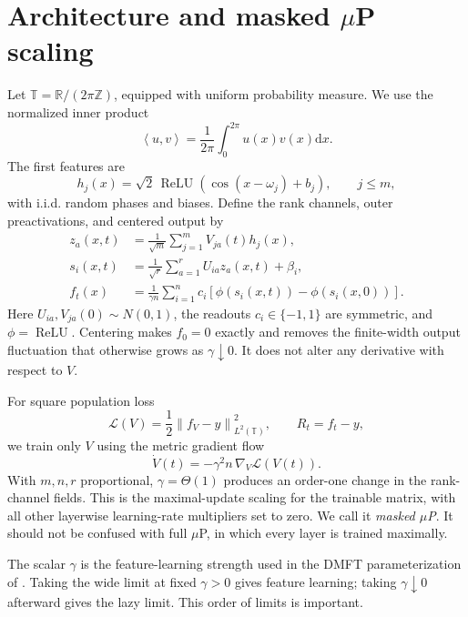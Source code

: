 \documentclass[11pt]{article}
\newcommand{\R}{\mathbb R}
\newcommand{\T}{\mathbb T}
\newcommand{\1}{\mathbf 1}
\newcommand{\ip}[2]{\left\langle #1,#2\right\rangle}
\newcommand{\norm}[1]{\left\lVert #1\right\rVert}
\newcommand{\ReLU}{\operatorname{ReLU}}
\newcommand{\dd}{\mathrm d}
\newcommand{\cL}{\mathcal L}
\theoremstyle{plain}
\theoremstyle{definition}
\begin{document}
\section{Architecture and masked \texorpdfstring{\(\mu\)P}{muP} scaling}
\label{sec:model}

Let \(\T=\R/(2\pi\mathbb Z)\), equipped with uniform probability measure.
We use the normalized inner product
\[
 \ip{u}{v}=\frac1{2\pi}\int_0^{2\pi}u(x)v(x)\dd x.
\]
The first features are
\begin{equation}
 h_j(x)=\sqrt2\,\ReLU\!\left(\cos(x-\omega_j)+b_j\right),
 \qquad j\leq m,
 \label{eq:first-features}
\end{equation}
with i.i.d. random phases and biases.  Define the rank channels, outer
preactivations, and centered output by
\begin{align}
 z_a(x,t)&=\frac1{\sqrt m}\sum_{j=1}^m V_{ja}(t)h_j(x),
 \label{eq:z}\\
 s_i(x,t)&=\frac1{\sqrt r}\sum_{a=1}^r U_{ia}z_a(x,t)+\beta_i,
 \label{eq:s}\\
 f_t(x)&=\frac1{\gamma n}\sum_{i=1}^n c_i
 \left[\phi(s_i(x,t))-\phi(s_i(x,0))\right].
 \label{eq:f}
\end{align}
Here \(U_{ia},V_{ja}(0)\sim N(0,1)\), the readouts \(c_i\in\{-1,1\}\)
are symmetric, and \(\phi=\ReLU\).  Centering makes \(f_0=0\) exactly and
removes the finite-width output fluctuation that otherwise grows as
\(\gamma\downarrow0\).  It does not alter any derivative with respect to
\(V\).

For square population loss
\begin{equation}
 \cL(V)=\frac12\norm{f_V-y}_{L^2(\T)}^2,
 \qquad R_t=f_t-y,
 \label{eq:loss}
\end{equation}
we train only \(V\) using the metric gradient flow
\begin{equation}
 \dot V(t)=-\gamma^2n\,\nabla_V\cL(V(t)).
 \label{eq:mup-flow}
\end{equation}
With \(m,n,r\) proportional, \(\gamma=\Theta(1)\) produces an order-one
change in the rank-channel fields.  This is the maximal-update scaling for
the trainable matrix, with all other layerwise learning-rate multipliers set
to zero.  We call it \emph{masked \(\mu\)P}.  It should not be confused with
full \(\mu\)P, in which every layer is trained maximally.

The scalar \(\gamma\) is the feature-learning strength used in the DMFT
parameterization of \citet{bordelon2022dmft}.  Taking the wide limit at fixed
\(\gamma>0\) gives feature learning; taking \(\gamma\downarrow0\) afterward
gives the lazy limit.  This order of limits is important.
\end{document}
